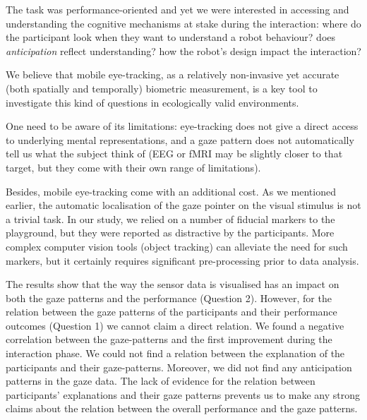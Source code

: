 \documentclass{sig-alternate}
\begin{document}
The task was performance-oriented and yet we were interested in accessing and
understanding the cognitive mechanisms at stake during the interaction: where do
the participant look when they want to understand a robot behaviour? does
\emph{anticipation} reflect understanding? how the robot's design impact the
interaction?

We believe that mobile eye-tracking, as a relatively non-invasive yet accurate
(both spatially and temporally) biometric measurement, is a key tool to
investigate this kind of questions in ecologically valid environments.

One need to be aware of its limitations: eye-tracking does not give a direct
access to underlying mental representations, and a gaze pattern does not
automatically tell us what the subject think of (EEG or fMRI may be slightly
closer to that target, but they come with their own range of limitations).

Besides, mobile eye-tracking come with an additional cost. As
we mentioned earlier, the automatic localisation of the gaze pointer on
the visual stimulus is not a trivial task. In our study, we relied on a 
number of fiducial markers to the playground, but they were reported as
distractive by the participants. More complex computer vision tools (object
tracking) can alleviate the need for such markers, but it certainly requires
significant pre-processing prior to data analysis.



The results show that the way the sensor data is visualised has an
impact on both the gaze patterns and the performance (Question 2).
However, for the relation between the gaze patterns of the participants
and their performance outcomes (Question 1) we cannot claim a direct
relation. We found a negative correlation between the gaze-patterns and
the first improvement during the interaction phase. We could not find a
relation between the explanation of the participants and their
gaze-patterns. Moreover, we did not find any anticipation patterns in
the gaze data. The lack of evidence for the relation between
participants' explanations and their gaze patterns prevents us to make
any strong claims about the relation between the overall performance and
the gaze patterns.
\end{document}
